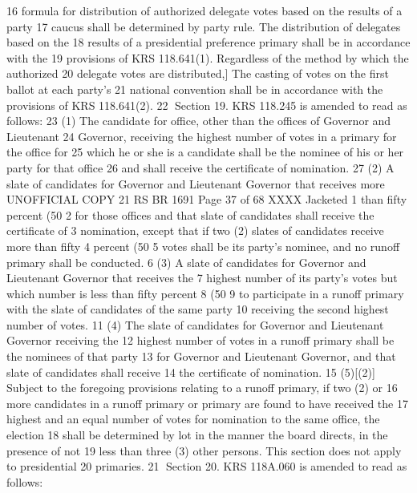 16 formula for distribution of authorized delegate votes based on the results of a party
17 caucus shall be determined by party rule. The distribution of delegates based on the
18 results of a presidential preference primary shall be in accordance with the
19 provisions of KRS 118.641(1). Regardless of the method by which the authorized
20 delegate votes are distributed,] The casting of votes on the first ballot at each party's
21 national convention shall be in accordance with the provisions of KRS 118.641(2).
22 Section 19. KRS 118.245 is amended to read as follows:
23 (1) The candidate for office, other than the offices of Governor and Lieutenant
24 Governor, receiving the highest number of votes in a primary for the office for
25 which he or she is a candidate shall be the nominee of his or her party for that office
26 and shall receive the certificate of nomination.
27 (2) A slate of candidates for Governor and Lieutenant Governor that receives more 
UNOFFICIAL COPY 21 RS BR 1691
Page 37 of 68
XXXX Jacketed
1 than fifty percent (50%
2 for those offices and that slate of candidates shall receive the certificate of
3 nomination, except that if two (2) slates of candidates receive more than fifty
4 percent (50%
5 votes shall be its party's nominee, and no runoff primary shall be conducted.
6 (3) A slate of candidates for Governor and Lieutenant Governor that receives the
7 highest number of its party's votes but which number is less than fifty percent
8 (50%
9 to participate in a runoff primary with the slate of candidates of the same party
10 receiving the second highest number of votes.
11 (4) The slate of candidates for Governor and Lieutenant Governor receiving the
12 highest number of votes in a runoff primary shall be the nominees of that party
13 for Governor and Lieutenant Governor, and that slate of candidates shall receive
14 the certificate of nomination.
15 (5)[(2)] Subject to the foregoing provisions relating to a runoff primary, if two (2) or
16 more candidates in a runoff primary or primary are found to have received the
17 highest and an equal number of votes for nomination to the same office, the election
18 shall be determined by lot in the manner the board directs, in the presence of not
19 less than three (3) other persons. This section does not apply to presidential
20 primaries.
21 Section 20. KRS 118A.060 is amended to read as follows:

